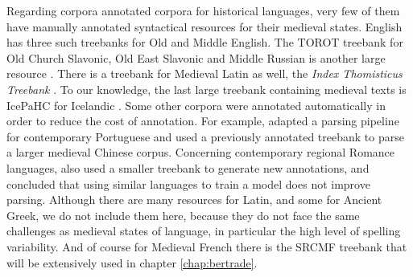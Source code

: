 Regarding corpora annotated corpora for historical languages, very few of them have manually annotated syntactical resources for their medieval states. English has three such treebanks \citep{oxford-2001-the,kroch-etal-2000-the,traugott-pintzuk-2008-coding} for Old and Middle English. The TOROT treebank for Old Church Slavonic, Old East Slavonic and Middle Russian is another large resource \citep{berdicevskis-eckhoff-2020-diachronic}. There is a treebank for Medieval Latin as well, the \emph{Index Thomisticus Treebank} \citep{passarotti-2019-project}. To our knowledge, the last large treebank containing medieval texts is IcePaHC for Icelandic \citep{rognvaldsson-etal-2012-icelandic}. Some other corpora were annotated automatically in order to reduce the cost of annotation. For example, \citet{rocio-etal-2003-automated} adapted a parsing pipeline for contemporary Portuguese and \citet{lee-kong-2014-a} used a previously annotated treebank \citep{lee-kong-2012-dependency} to parse a larger medieval Chinese corpus. Concerning contemporary regional Romance languages, \citet{miletic-etal-2020-building} also used a smaller treebank to generate new annotations, and concluded that using similar languages to train a model does not improve parsing. Although there are many resources for Latin, and some for Ancient Greek, we do not include them here, because they do not face the same challenges as medieval states of language, in particular the high level of spelling variability. And of course for Medieval French there is the SRCMF treebank that will be extensively used in chapter \ref{chap:bertrade}.
